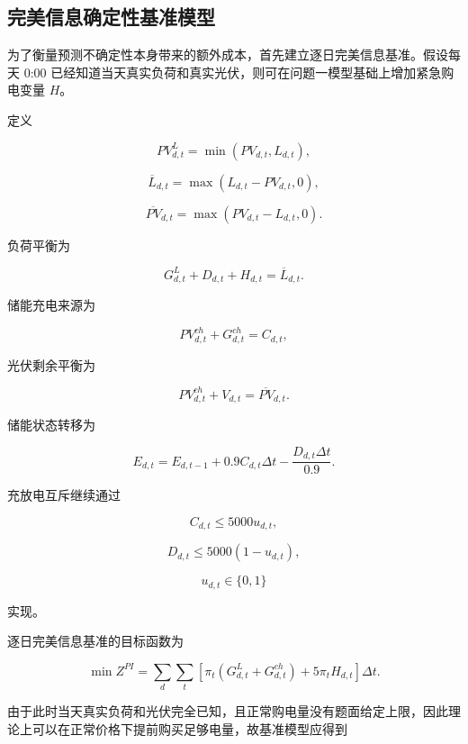 \subsection{完美信息确定性基准模型}

为了衡量预测不确定性本身带来的额外成本，首先建立逐日完美信息基准。假设每天 0:00 已经知道当天真实负荷和真实光伏，则可在问题一模型基础上增加紧急购电变量 \(H\)。

定义

\[
PV^L_{d,t}=\min(PV_{d,t},L_{d,t}),
\]

\[
\overline L_{d,t}
=
\max(L_{d,t}-PV_{d,t},0),
\]

\[
\overline{PV}_{d,t}
=
\max(PV_{d,t}-L_{d,t},0).
\]

负荷平衡为

\begin{equation}
G^L_{d,t}+D_{d,t}+H_{d,t}
=
\overline L_{d,t}.
\end{equation}

储能充电来源为

\begin{equation}
PV^{ch}_{d,t}+G^{ch}_{d,t}
=
C_{d,t},
\end{equation}

光伏剩余平衡为

\begin{equation}
PV^{ch}_{d,t}+V_{d,t}
=
\overline{PV}_{d,t}.
\end{equation}

储能状态转移为

\begin{equation}
E_{d,t}
=
E_{d,t-1}
+
0.9C_{d,t}\Delta t
-
\frac{D_{d,t}\Delta t}{0.9}.
\end{equation}

充放电互斥继续通过

\[
C_{d,t}\le5000u_{d,t},
\]

\[
D_{d,t}\le5000(1-u_{d,t}),
\]

\begin{equation}
u_{d,t}\in\{0,1\}
\end{equation}

实现。

逐日完美信息基准的目标函数为

\begin{equation}
\min Z^{PI}
=
\sum_d\sum_t
\left[
\pi_t(G^L_{d,t}+G^{ch}_{d,t})
+
5\pi_tH_{d,t}
\right]\Delta t.
\end{equation}

由于此时当天真实负荷和光伏完全已知，且正常购电量没有题面给定上限，因此理论上可以在正常价格下提前购买足够电量，故基准模型应得到

